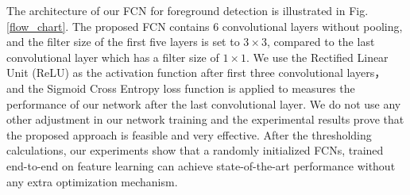 \documentclass[journal]{IEEEtran}
\newcommand{\reffig}[1]{Fig. \ref{#1}}
\begin{document}
The architecture of our FCN for foreground detection is illustrated in \reffig{flow_chart}. 
The proposed FCN contains 6 convolutional layers without pooling, and the filter size of the first five layers is set to $3\times 3$, compared to the last convolutional layer which has a filter size of $1\times 1$. 
We use the Rectified Linear Unit (ReLU) as the activation function after first three convolutional layers，
and the Sigmoid Cross Entropy loss function is applied to measures the performance of our network after the last convolutional layer. 
We do not use any other adjustment in our network training and the experimental results prove that the proposed approach is feasible and very effective.
After the thresholding calculations, our experiments show that a randomly initialized FCNs, 
trained end-to-end on feature learning can achieve state-of-the-art performance without any extra optimization mechanism.



% 
% 
\end{document}
